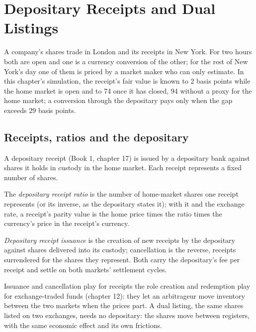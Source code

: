 \chapter{Depositary Receipts and Dual Listings}\label{ch:hf:depositary-receipts-and-dual-listings}

A company's shares trade in London and its receipts in New York. For two hours both are open and one is a currency conversion of the other; for the
rest of New York's day one of them is priced by a market maker who can only estimate. In this chapter's simulation, the receipt's fair value is
known to 2 basis points while the home market is open and to 74 once it has closed, 94 without a proxy for the home market; a conversion through the
depositary pays only when the gap exceeds 29 basis points.

\section{Receipts, ratios and the depositary}

A depositary receipt (Book 1, chapter 17) is issued by a depositary bank against shares it holds in custody in the home market. Each receipt
represents a fixed number of shares.

\begin{definition}\label{def:hf:depositary-receipts-and-dual-listings:ratio}
The \emph{depositary receipt ratio} is the number of home-market shares one receipt represents (or its inverse,
as the depositary states it); with it and the exchange rate, a receipt's parity value is the home price times the ratio times the currency's price in
the receipt's currency.
\end{definition}

\begin{definition}\label{def:hf:depositary-receipts-and-dual-listings:issuance}
\emph{Depositary receipt issuance} is the creation of new receipts by the depositary against shares delivered
into its custody; cancellation is the reverse, receipts surrendered for the shares they represent. Both carry the depositary's fee per receipt and
settle on both markets' settlement cycles.
\end{definition}

Issuance and cancellation play for receipts the role creation and redemption play for exchange-traded funds (chapter 12): they let an arbitrageur
move inventory between the two markets when the prices part. A dual listing, the same shares listed on two exchanges, needs no depositary: the
shares move between registers, with the same economic effect and its own frictions.

